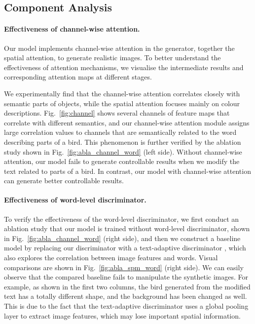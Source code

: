 \documentclass{article}
\begin{document}
\subsection{Component Analysis}

\paragraph{Effectiveness of channel-wise attention.} Our model implements channel-wise attention in the generator, together the spatial attention, to generate realistic images. To better understand the effectiveness of attention mechanisms, we visualise the intermediate results and corresponding attention maps at different stages.

We experimentally find that the channel-wise attention correlates closely with semantic parts of objects, while the spatial attention focuses mainly on colour descriptions. Fig.~\ref{fig:channel} shows several channels of feature maps that correlate with different semantics, and our channel-wise attention module assigns large correlation values to channels that are semantically related to the word describing parts of a bird. This phenomenon is further verified by the ablation study shown in Fig.~\ref{fig:abla_channel_word} (left side). Without channel-wise attention, our model fails to generate controllable results when we modify the text related to parts of a bird. In contrast, our model with channel-wise attention can generate better controllable results.

\paragraph{Effectiveness of word-level discriminator.}
To verify the effectiveness of the word-level discriminator, we first conduct an ablation study that our model is trained without word-level discriminator, shown in Fig.~\ref{fig:abla_channel_word} (right side), and then we construct a baseline model by replacing our discriminator with a text-adaptive discriminator \cite{nam2018text}, which also explores the correlation between image features and words. Visual comparisons are shown in Fig.~\ref{fig:abla_spm_word} (right side). We can easily observe that the compared baseline fails to manipulate the synthetic images. For example, as shown in the first two columns, the bird generated from the modified text has a totally different shape, and the background has been changed as well. This is due to the fact that the text-adaptive discriminator \cite{nam2018text} uses a global pooling layer to extract image features, which may lose important spatial information.
\end{document}
